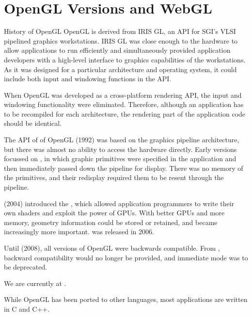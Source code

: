 \documentclass[\main/notes.tex]{subfiles}
\begin{document}
		\section{OpenGL Versions and WebGL}
			\begin{sidenote}{History of OpenGL}
				OpenGL is derived from IRIS GL,
				an API for SGI's VLSI pipelined graphics workstations.
				IRIS GL was close enough to the hardware to allow applications to run efficiently
				and simultaneously
				provided application developers with a high-level interface
				to graphics capabilities of the workstations.
				As it was designed for a particular architecture and operating system,
				it could include both input and windowing functions in the API.

				When OpenGL was developed as a cross-platform rendering API,
				the input and windowing functionality were eliminated.
				Therefore, although an application has to be recompiled for each architecture,
				the rendering part of the application code should be identical.

				The API of  of OpenGL (1992)
				was based on the graphics pipeline architecture,
				but there was almost no ability to access the hardware directly.
				Early versions focussed on ,
				in which graphic primitives were specified in the application
				and then immediately passed down the pipeline for display.
				There was no memory of the primitives,
				and their redisplay required them to be resent through the pipeline.

				 (2004) introduced the ,
				which allowed application programmers to write their own shaders
				and exploit the power of GPUs.
				With better GPUs and more memory,
				geometry information could be stored or retained,
				and  became increasingly more important.
				 was released in 2006.

				Until  (2008),
				all versions of OpenGL were backwards compatible.
				From ,
				backward compatibility would no longer be provided,
				and immediate mode was to be deprecated.

				We are currently at .
			\end{sidenote}

			While OpenGL has been ported to other languages,
			most applications are written in C and C++.
\end{document}
